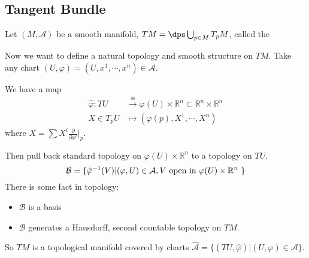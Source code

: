  \subsection{Tangent Bundle}
 Let  $ (M,\mathcal{A}) $ be a smooth manifold,  $ TM=\dps\bigcup_{p\in M}T_pM $, called the 
 
 Now we want to define a natural topology and smooth structure on  $ TM $. Take any chart  $ (U,\varphi)=(U,x^1,\cdots,x^n)\in \mathcal{A} $.
 
 We have a map 
 \begin{align}
    \hat{\varphi}:TU&\xrightarrow{\cong}\varphi(U)\times\mathbb{R}^n\subset \mathbb{R}^n\times\mathbb{R}^n\\
    X\in T_pU&\mapsto (\varphi(p),X^1,\cdots,X^n)
 \end{align}  
 where  $ X=\sum X^i\frac{\partial}{\partial x^i}|_p $.
 
 Then pull back standard topology on  $ \varphi(U)\times\mathbb{R}^n $ to a topology on  $ TU $.
 \[\mathcal{B}=\{\hat{\varphi}^{-1}(V)|(\varphi,U)\in \mathcal{A},  V \text{ open in  $ \varphi(U)\times\mathbb{R}^n $ }\}\]
 There is some fact in topology:
 \begin{itemize}
    \item  $ \mathcal{B} $ is a basis
    \item  $ \mathcal{B} $ generates a Hausdorff, second countable topology on  $ TM $. 
 \end{itemize} 
 So  $ TM  $ is a topological manifold covered by charts  $ \hat{\mathcal{A}}=\{(TU,\hat{\varphi})|(U,\varphi)\in\mathcal{A}\} $.
 

